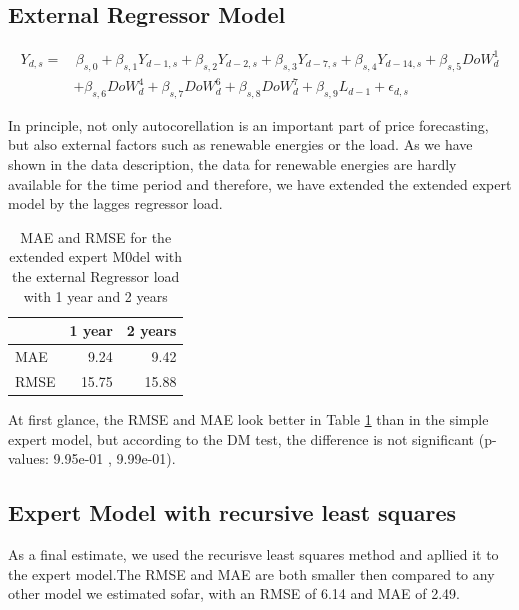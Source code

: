 \documentclass[12pt,a4paper]{article}
\begin{document}
\hypertarget{external-regressor-model}{%
\subsection{External Regressor Model}\label{external-regressor-model}}

\begin{align*}
 Y_{d,s} = &  \, \beta_{s,0 } + \beta_{s,1 } Y_{ d-1,s} + \beta_{s,2 } Y_{ d-2,s} + \beta_{s,3 } Y_{ d-7,s}  + \beta_{s,4 } Y_{ d-14,s} + \beta_{s,5 } DoW^1_{d} \\ 
  &   + \beta_{s,6 } DoW^4_{d}  + \beta_{s,7 } DoW^6_{d} + \beta_{s,8 } DoW^7_{d} + \beta_{s,9 } L_{d-1}  +\epsilon_{d,s}
\end{align*}

In principle, not only autocorellation is an important part of price
forecasting, but also external factors such as renewable energies or the
load. As we have shown in the data description, the data for renewable
energies are hardly available for the time period and therefore, we have
extended the extended expert model by the lagges regressor load.

\begin{table}[!h]

\caption{\label{tab:external model}\label{tab:external} MAE and RMSE for the extended expert M0del with the external Regressor load with 1 year and 2 years }
\centering
\begin{tabular}{lrr}
\toprule
  & 1 year &  2 years\\
\midrule
\rowcolor{gray!6}  MAE & 9.24 & 9.42\\
RMSE & 15.75 & 15.88\\
\bottomrule
\end{tabular}
\end{table}

At first glance, the \ac{RMSE} and \ac{MAE} look better in Table
\ref{tab:external} than in the simple expert model, but according to the
DM test, the difference is not significant (p-values: 9.95e-01 ,
9.99e-01).

\hypertarget{expert-model-with-recursive-least-squares}{%
\subsection{Expert Model with recursive least
squares}\label{expert-model-with-recursive-least-squares}}

As a final estimate, we used the recurisve least squares method and
apllied it to the expert model.The RMSE and MAE are both smaller then
compared to any other model we estimated sofar, with an RMSE of 6.14 and
MAE of 2.49.
\end{document}
